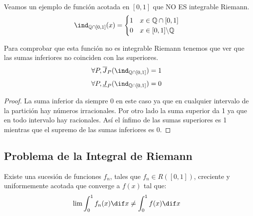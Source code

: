 \documentclass{apuntes}
\begin{document}
\begin{example} $ $

Veamos un ejemplo de función acotada en $[0,1]$ que NO ES integrable Riemann.
\[
 \ind_{\mathbb{Q}  \cap  [0,1]} (x) =
  \begin{cases}
   1 &  x \in \mathbb{Q} \cap [0,1] \\
   0       &  x \in [0,1] \backslash \mathbb{Q}
  \end{cases}
\]

Para comprobar que esta función no es integrable Riemann tenemos que ver que las sumas inferiores no coinciden con las superiores.
\[\forall P, \overline{J}_P(\ind_{\mathbb{Q} \cap [0,1]}) = 1\]
\[\forall P, \underline{J}_P(	\ind_{\mathbb{Q} \cap [0,1]}) = 0\]


\begin{proof}
La suma inferior da siempre 0 en este caso ya que en cualquier intervalo de la partición hay números irracionales. Por otro lado la suma superior da 1 ya que en todo intervalo hay racionales. Así el ínfimo de las sumas superiores es 1 mientras que el supremo de las sumas inferiores es 0.
\end{proof}
\end{example}

\subsection{Problema de la Integral de Riemann}
Existe una sucesión de funciones $f_n$, tales que $f_n\in R([ 0, 1 ])$, creciente y uniformemente acotada que converge a $f(x)$ tal que:
\[\lim \int_0^1 f_n(x) \dif x \neq \int_0^1 f(x) \dif x\]
\end{document}
